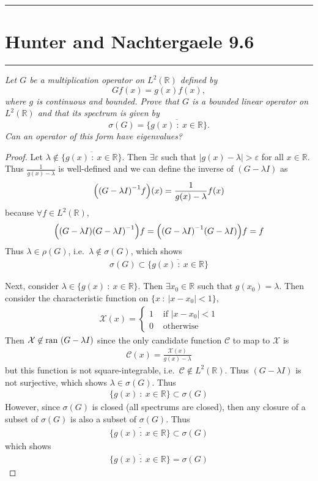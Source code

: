 \documentclass{article} %
\theoremstyle{plain}
\newcommand{\E}{\varepsilon}
\def\Rl{\mathbb{R}}
\newcommand{\ran}{\text{\rm ran }}
\newcommand{\problem}[1]{
\vspace{.375cm}
\begin{minipage}{\textwidth}
    \begin{center}
        \noindent\rule{5cm}{1pt}
    \end{center}
    \section{\bf #1}
    \begin{center}
        \noindent\rule{5cm}{1pt}
    \end{center}
    \vspace{0.25cm}
\end{minipage}
}
\numberwithin{equation}{section} %
\numberwithin{figure}{section} %
\numberwithin{table}{section} %
\begin{document}
\problem{Hunter and Nachtergaele 9.6}
\emph{Let $G$ be a multiplication operator on $L^2(\Rl)$ defined by $$Gf(x) = g(x)f(x),$$ where $g$ is continuous and bounded.  Prove that $G$ is a bounded linear operator on $L^2(\Rl)$ and that its spectrum is given by $$\sigma(G) = \overline{\{g(x)\ :\ x \in \Rl\}}.$$  Can an operator of this form have eigenvalues?}
\begin{proof}
    Let $\lambda \not\in \overline{\{g(x)\ :\ x \in \Rl\}}$.  Then $\exists \E$ such that $|g(x) - \lambda| > \E$ for all $x \in \Rl$.  Thus $\frac{1}{g(x) - \lambda}$ is well-defined and we can define the inverse of $(G - \lambda I)$ as
    \begin{align*}
        \qty(\qty(G - \lambda I)^{-1}f)(x) = \frac{1}{g(x) - \lambda}f(x)
    \end{align*}
    because $\forall f \in L^2(\Rl)$,
    \begin{align*}
        \qty(\qty(G - \lambda I)\qty(G - \lambda I)^{-1})f = \qty(\qty(G - \lambda I)^{-1}\qty(G - \lambda I))f = f
    \end{align*}
    Thus $\lambda \in \rho(G)$, i.e.~$\lambda \not\in\sigma(G)$, which shows
    \begin{align*}
        \sigma(G) \subset \overline{\{g(x)\ :\ x \in \Rl\}}
    \end{align*}

    Next, consider $\lambda \in \{g(x)\ :\ x \in \Rl\}$.  Then $\exists x_0 \in \Rl$ such that $g(x_0) = \lambda$.  Then consider the characteristic function on $\{x\ :\ |x - x_0| < 1\}$,
    \begin{align*}
        \mathcal{X}(x) = \begin{cases}
            1 & \text{ if } |x - x_0| < 1 \\
            0 & \text{ otherwise}
        \end{cases}
    \end{align*}
    Then $\mathcal{X} \not\in\ran(G - \lambda I)$ since the only candidate function $\mathcal{C}$ to map to $\mathcal{X}$ is
    \begin{align*}
        \mathcal{C}(x) = \frac{\mathcal{X}(x)}{g(x) - \lambda}
    \end{align*}
    but this function is not square-integrable, i.e.~$\mathcal{C} \not\in L^2(\Rl)$.  Thus $(G - \lambda I)$ is not surjective, which shows $\lambda \in \sigma(G)$.  Thus
    \begin{align*}
        \{g(x)\ :\ x\in\Rl\} \subset \sigma(G)
    \end{align*}
    However, since $\sigma(G)$ is closed (all spectrums are closed), then any closure of a subset of $\sigma(G)$ is also a subset of $\sigma(G)$.  Thus
    \begin{align*}
        \overline{\{g(x)\ :\ x\in\Rl\}} \subset \sigma(G)
    \end{align*}
    which shows
    \begin{align*}
        \overline{\{g(x)\ :\ x\in\Rl\}} = \sigma(G)
    \end{align*}


\end{proof}
\end{document}
